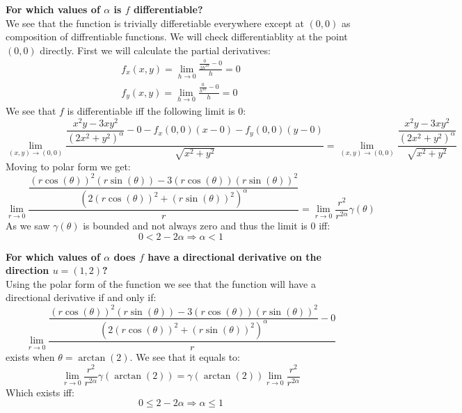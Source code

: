 \documentclass{article}
\theoremstyle{plain}
\begin{document}
	\newpage
	
	\textbf{For which values of $\alpha$ is $f$ differentiable?} \\
	We see that the function is trivially differetiable everywhere
	except at $(0,0)$ as composition of diffrentiable functions.
	We will check differentiablity at the point $(0,0)$ directly.
	First we will calculate the partial derivatives:
	\begin{align*}
		f_x(x,y) = \lim_{h\to 0}
		{\frac{\frac{0}{2h^{2\alpha}} - 0}{h}} = 0 \\
		f_y(x,y) = \lim_{h\to 0}
		{\frac{\frac{0}{h^{2\alpha}} - 0}{h}} = 0
	\end{align*}
	We see that $f$ is differentiable iff the following limit is $0$:
	\[
		\lim_{(x,y)\to(0,0)}{\frac{\dfrac{x^2y-3xy^2}{(2x^2+y^2)^\alpha} - 0 - f_x(0,0)(x-0) - f_y(0,0)(y-0)}{\sqrt{x^2+y^2}}} = 
		\lim_{(x,y)\to(0,0)}{\frac{\dfrac{x^2y-3xy^2}{(2x^2+y^2)^\alpha}}{\sqrt{x^2+y^2}}}
	\]
	Moving to polar form we get: 
	\[
	\lim_{r\to 0}{\frac{\dfrac{(r\cos(\theta))^2(r\sin(\theta))-3(r\cos(\theta))(r\sin(\theta))^2}{(2(r\cos(\theta))^2+(r\sin(\theta))^2)^\alpha}}{r}} = \lim_{r\to 0}{\frac{r^2}{r^{2\alpha}}\gamma(\theta)}
	\]
	As we saw $\gamma(\theta)$ is bounded and not always zero and thus the limit
	is $0$ iff:
	\[
		0 < {2-2\alpha} \Rightarrow \boxed{\alpha < 1}
	\]
	
	\newpage
	
	\textbf{For which values of $\alpha$ does $f$ have a directional 
	derivative on the direction $u=(1,2)$?} \\
	Using the polar form of the function we see that the function
	will have a directional derivative if and only if:
	\[
		\lim_{r\to 0}{\frac{\dfrac{(r\cos(\theta))^2(r\sin(\theta))-3(r\cos(\theta))(r\sin(\theta))^2}{(2(r\cos(\theta))^2+(r\sin(\theta))^2)^\alpha} - 0}{r}}
	\]
	exists when $\theta = \arctan(2)$. We see that it equals to:
	\[
		\lim_{r\to 0}{\frac{r^2}{r^{2\alpha}}\gamma(\arctan(2))} = 
		\gamma(\arctan(2))\lim_{r\to 0}{\frac{r^2}{r^{2\alpha}}}
	\]
	Which exists iff:
	\[
		0 \le {2-2\alpha} \Rightarrow \boxed{\alpha \le 1}
	\]
	
	\newpage
	
\end{document}
